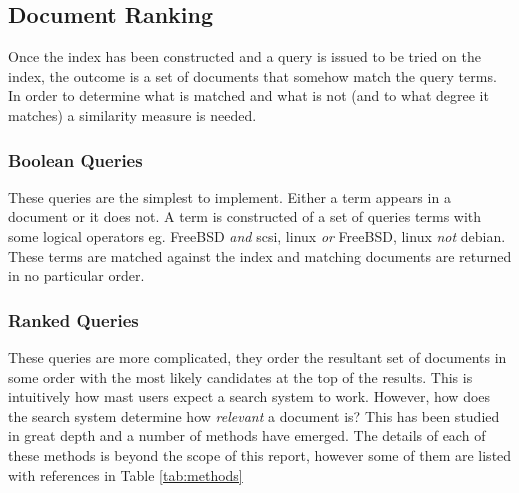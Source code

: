 \subsection{Document Ranking}

Once the index has been constructed and a query is issued to be tried on the index, the outcome is a set of documents that somehow match the query terms.  In order to determine what is matched and what is not (and to what degree it matches) a similarity measure is needed.

\subsubsection{Boolean Queries}
These queries are the simplest to implement.  Either a term appears in a document or it does not.  A term is constructed of a set of queries terms with some logical operators eg. FreeBSD \emph{and} scsi, linux \emph{or} FreeBSD, linux \emph{not} debian.  These terms are matched against the index and matching documents are returned in no particular order.

\subsubsection{Ranked Queries}
These queries are more complicated, they order the resultant set of documents in some order with the most likely candidates at the top of the results.  This is intuitively how mast users expect a search system to work.  However, how does the search system determine how \emph{relevant} a document is?  This has been studied in great depth and a number of methods have emerged.  The details of each of these methods is beyond the scope of this report, however some of them are listed with references in Table \ref{tab:methods}

